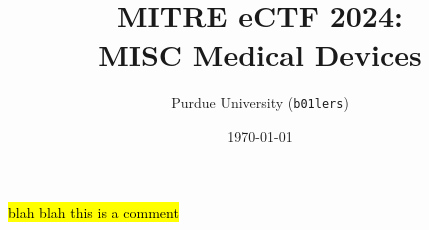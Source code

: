 \documentclass{article}
\title{MITRE eCTF 2024:\\MISC Medical Devices}
\author{Purdue University (\texttt{b01lers})}
\date{\today}
\newif\iflong
\newcommand{\jw}[1]{\iflong\textcolor{Purple}{#1 --JW}\fi}
\begin{document}
\maketitle

\jw{This is a comment. Ctrl+F \texttt{main.tex} to find how do fefine one yourself. Replace color and signature if you want one too.}

\jw{For each section, use a new file to make merge conflicts / collab less annoying. e.g. see \texttt{intro.tex} for introduction}

\hl{blah blah this is a comment}










\newpage


\end{document}
